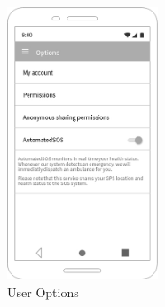 \begin{figure}[h!]
 \centering
   \includegraphics[width=0.4\textwidth]{img/mockup/u_options.jpg}
    \caption{User Options}
\end{figure}


